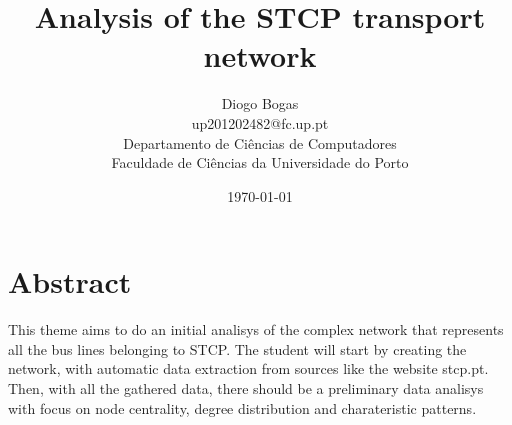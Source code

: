 \documentclass[12pt]{article}
\title{Analysis of the STCP transport network}
\author{Diogo Bogas \\ 
        up201202482@fc.up.pt \\ 
        Departamento de Ciências de Computadores\\
        Faculdade de Ciências da Universidade do Porto\\
        }
\date{\today}
\begin{document}
\maketitle
{}


\section{Abstract}

This theme aims to do an initial analisys of the complex network that represents all the bus lines belonging to STCP. The student will start by creating the network, with automatic data extraction from sources like the website stcp.pt.
Then, with all the gathered data, there should be a preliminary data analisys with focus on node centrality, degree distribution and charateristic patterns.
\end{document}
